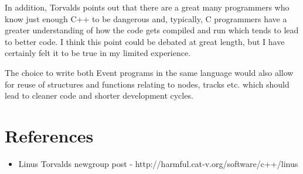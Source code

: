 \documentclass[a4paper, twoside]{article}
\begin{document}
In addition, Torvalds points out that there are a great many programmers who
know just enough C++ to be dangerous and, typically, C programmers have a
greater understanding of how the code gets compiled and run which tends to lead
to better code. I think this point could be debated at great length, but I have
certainly felt it to be true in my limited experience.

The choice to write both Event programs in the same language would also allow
for reuse of structures and functions relating to nodes, tracks etc. which
should lead to cleaner code and shorter development cycles.

\section{References}
\begin{itemize}
	\item{Linus Torvalds newgroup post - 
		http://harmful.cat-v.org/software/c++/linus}
\end{itemize}
\end{document}
